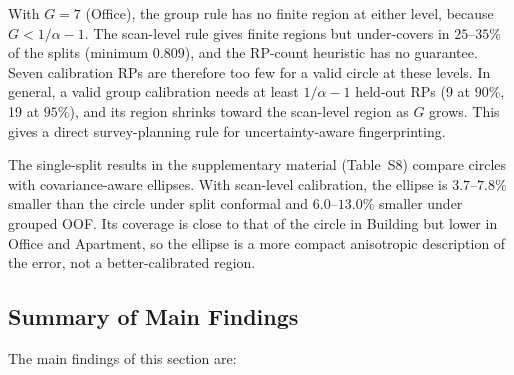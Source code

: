 With $G=7$ (Office), the group rule has no finite region at either level, because $G<1/\alpha-1$. The scan-level rule gives finite regions but under-covers in $25$--$35\%$ of the splits (minimum $0.809$), and the RP-count heuristic has no guarantee. Seven calibration RPs are therefore too few for a valid circle at these levels. In general, a valid group calibration needs at least $1/\alpha-1$ held-out RPs (9 at $90\%$, 19 at $95\%$), and its region shrinks toward the scan-level region as $G$ grows. This gives a direct survey-planning rule for uncertainty-aware fingerprinting.

The single-split results in the supplementary material (Table~S8) compare circles with covariance-aware ellipses. With scan-level calibration, the ellipse is $3.7$--$7.8\%$ smaller than the circle under split conformal and $6.0$--$13.0\%$ smaller under grouped OOF. Its coverage is close to that of the circle in Building but lower in Office and Apartment, so the ellipse is a more compact anisotropic description of the error, not a better-calibrated region.

\subsection{Summary of Main Findings}
\label{subsec:results_summary}

The main findings of this section are:

